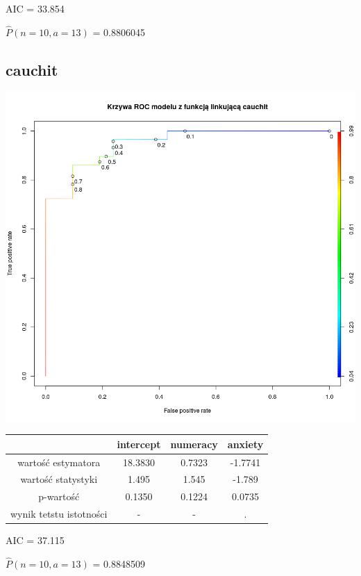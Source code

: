 \documentclass[a4paper,11pt]{article}
\begin{document}
AIC =  33.854

$\widehat{P}(n  = 10, a = 13)$  = 0.8806045 
 
\subsection{cauchit}
\includegraphics[scale=.25]{plot3.png} 

\begin{tabular}{|c|c|c|c|}
 & intercept & numeracy & anxiety \\ \hline
 wartość estymatora &  18.3830  & 0.7323  & -1.7741     \\
 wartość statystyki &   1.495  &  1.545 & -1.789 \\
 p-wartość &  0.1350   &  0.1224  &   0.0735\\
 wynik tetstu istotności & - & - & . \\ \hline
\end{tabular}

AIC = 37.115

$\widehat{P}(n  = 10, a = 13)$  = 0.8848509 
\end{document}
